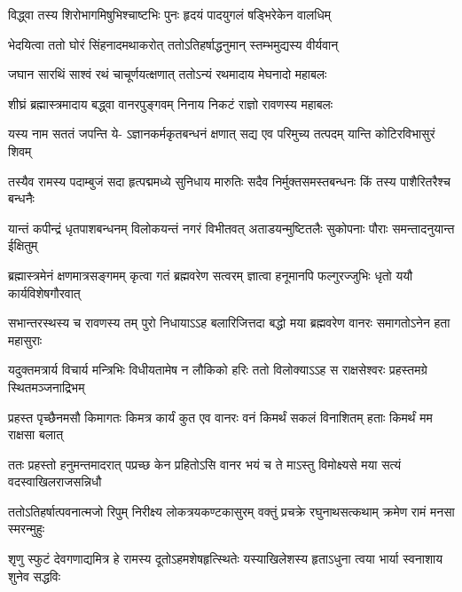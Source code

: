 \twolineshloka
{विद्ध्वा तस्य शिरोभागमिषुभिश्चाष्टभिः पुनः}
{हृदयं पादयुगलं षड्भिरेकेन वालधिम्} %

\twolineshloka
{भेदयित्वा ततो घोरं सिंहनादमथाकरोत्}
{ततोऽतिहर्षाद्धनुमान् स्तम्भमुद्यस्य वीर्यवान्} %

\twolineshloka
{जघान सारथिं साश्वं रथं चाचूर्णयत्क्षणात्}
{ततोऽन्यं रथमादाय मेघनादो महाबलः} %

\twolineshloka
{शीघ्रं ब्रह्मास्त्रमादाय बद्ध्वा वानरपुङ्गवम्}
{निनाय निकटं राज्ञो रावणस्य महाबलः} %

\fourlineindentedshloka
{यस्य नाम सततं जपन्ति ये-}
{ऽज्ञानकर्मकृतबन्धनं क्षणात्}
{सद्य एव परिमुच्य तत्पदम्}
{यान्ति कोटिरविभासुरं शिवम्} %

\fourlineindentedshloka
{तस्यैव रामस्य पदाम्बुजं सदा}
{हृत्पद्ममध्ये सुनिधाय मारुतिः}
{सदैव निर्मुक्तसमस्तबन्धनः}
{किं तस्य पाशैरितरैश्च बन्धनैः} %






\fourlineindentedshloka
{यान्तं कपीन्द्रं धृतपाशबन्धनम्}
{विलोकयन्तं नगरं विभीतवत्}
{अताडयन्मुष्टितलैः सुकोपनाः}
{पौराः समन्तादनुयान्त ईक्षितुम्} %

\fourlineindentedshloka
{ब्रह्मास्त्रमेनं क्षणमात्रसङ्गमम्}
{कृत्वा गतं ब्रह्मवरेण सत्वरम्}
{ज्ञात्वा हनूमानपि फल्गुरज्जुभिः}
{धृतो ययौ कार्यविशेषगौरवात्} %

\fourlineindentedshloka
{सभान्तरस्थस्य च रावणस्य तम्}
{पुरो निधायाऽऽह बलारिजित्तदा}
{बद्धो मया ब्रह्मवरेण वानरः}
{समागतोऽनेन हता महासुराः} %

\fourlineindentedshloka
{यदुक्तमत्रार्य विचार्य मन्त्रिभिः}
{विधीयतामेष न लौकिको हरिः}
{ततो विलोक्याऽऽह स राक्षसेश्वरः}
{प्रहस्तमग्रे स्थितमञ्जनाद्रिभम्} %

\fourlineindentedshloka
{प्रहस्त पृच्छैनमसौ किमागतः}
{किमत्र कार्यं कुत एव वानरः}
{वनं किमर्थं सकलं विनाशितम्}
{हताः किमर्थं मम राक्षसा बलात्} %

\fourlineindentedshloka
{ततः प्रहस्तो हनुमन्तमादरात्}
{पप्रच्छ केन प्रहितोऽसि वानर}
{भयं च ते माऽस्तु विमोक्ष्यसे मया}
{सत्यं वदस्वाखिलराजसन्निधौ} %

\fourlineindentedshloka
{ततोऽतिहर्षात्पवनात्मजो रिपुम्}
{निरीक्ष्य लोकत्रयकण्टकासुरम्}
{वक्तुं प्रचक्रे रघुनाथसत्कथाम्}
{क्रमेण रामं मनसा स्मरन्मुहुः} %

\fourlineindentedshloka
{शृणु स्फुटं देवगणाद्यमित्र हे}
{रामस्य दूतोऽहमशेषहृत्स्थितेः}
{यस्याखिलेशस्य हृताऽधुना त्वया}
{भार्या स्वनाशाय शुनेव सद्धविः} %

